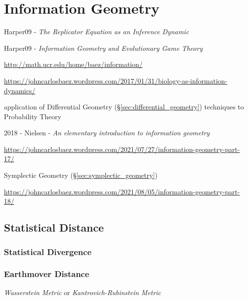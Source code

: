 \section{Information Geometry}\label{sec:information_geometry}

Harper09 - \emph{The Replicator Equation as an Inference Dynamic}

Harper09 - \emph{Information Geometry and Evolutionary Game Theory}

\url{http://math.ucr.edu/home/baez/information/}

\url{https://johncarlosbaez.wordpress.com/2017/01/31/biology-as-information-dynamics/}

application of Differential Geometry
(\S\ref{sec:differential_geometry}) techniques to Probability Theory

2018 - Nielsen - \emph{An elementary introduction to information geometry}

\url{https://johncarlosbaez.wordpress.com/2021/07/27/information-geometry-part-17/}

Symplectic Geometry (\S\ref{sec:symplectic_geometry})

\url{https://johncarlosbaez.wordpress.com/2021/08/05/information-geometry-part-18/}



\subsection{Statistical Distance}\label{sec:statistical_distance}


\subsubsection{Statistical Divergence}\label{sec:statistical_divergence}

\subsubsection{Earthmover Distance}\label{sec:earthmover_distance}

\emph{Wasserstein Metric} or \emph{Kantrovich-Rubinstein Metric}

